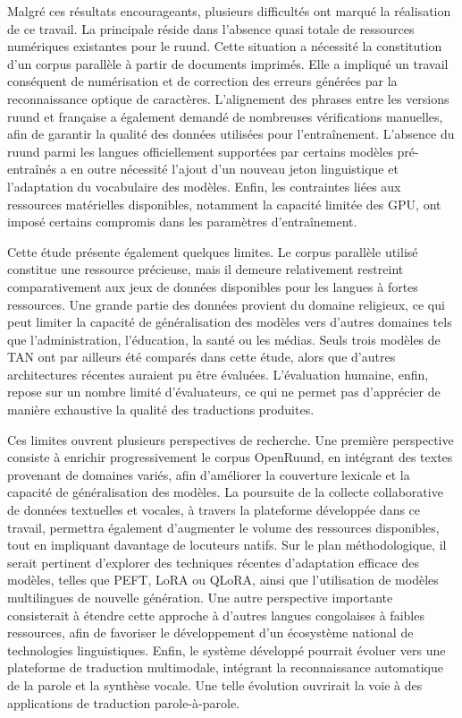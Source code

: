 Malgré ces résultats encourageants, plusieurs difficultés ont marqué la réalisation de ce travail. La principale réside dans l'absence quasi totale de ressources numériques existantes pour le ruund. Cette situation a nécessité la constitution d'un corpus parallèle à partir de documents imprimés. Elle a impliqué un travail conséquent de numérisation et de correction des erreurs générées par la reconnaissance optique de caractères. L'alignement des phrases entre les versions ruund et française a également demandé de nombreuses vérifications manuelles, afin de garantir la qualité des données utilisées pour l'entraînement. L'absence du ruund parmi les langues officiellement supportées par certains modèles pré-entraînés a en outre nécessité l'ajout d'un nouveau jeton linguistique et l'adaptation du vocabulaire des modèles. Enfin, les contraintes liées aux ressources matérielles disponibles, notamment la capacité limitée des \ac{GPU}, ont imposé certains compromis dans les paramètres d'entraînement.

Cette étude présente également quelques limites. Le corpus parallèle utilisé constitue une ressource précieuse, mais il demeure relativement restreint comparativement aux jeux de données disponibles pour les langues à fortes ressources. Une grande partie des données provient du domaine religieux, ce qui peut limiter la capacité de généralisation des modèles vers d'autres domaines tels que l'administration, l'éducation, la santé ou les médias. Seuls trois modèles de \ac{TAN} ont par ailleurs été comparés dans cette étude, alors que d'autres architectures récentes auraient pu être évaluées. L'évaluation humaine, enfin, repose sur un nombre limité d'évaluateurs, ce qui ne permet pas d'apprécier de manière exhaustive la qualité des traductions produites.

Ces limites ouvrent plusieurs perspectives de recherche. Une première perspective consiste à enrichir progressivement le corpus OpenRuund, en intégrant des textes provenant de domaines variés, afin d'améliorer la couverture lexicale et la capacité de généralisation des modèles. La poursuite de la collecte collaborative de données textuelles et vocales, à travers la plateforme développée dans ce travail, permettra également d'augmenter le volume des ressources disponibles, tout en impliquant davantage de locuteurs natifs. Sur le plan méthodologique, il serait pertinent d'explorer des techniques récentes d'adaptation efficace des modèles, telles que PEFT, LoRA ou QLoRA, ainsi que l'utilisation de modèles multilingues de nouvelle génération. Une autre perspective importante consisterait à étendre cette approche à d'autres langues congolaises à faibles ressources, afin de favoriser le développement d'un écosystème national de technologies linguistiques. Enfin, le système développé pourrait évoluer vers une plateforme de traduction multimodale, intégrant la reconnaissance automatique de la parole et la synthèse vocale. Une telle évolution ouvrirait la voie à des applications de traduction parole-à-parole.

